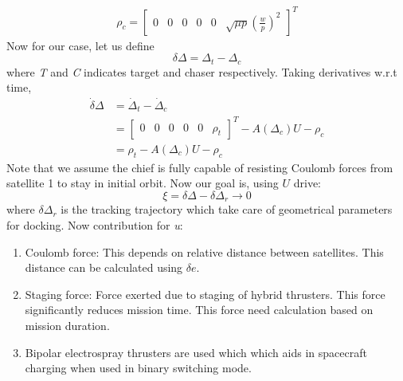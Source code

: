 \documentclass[]{article}
\theoremstyle{remark}
\theoremstyle{definition}
\begin{document}
	\begin{align}
		\rho_c = \begin{bmatrix} 0 & 0 & 0 &0& 0 & \sqrt{\mu p}\left(\frac{w}{p}\right)^2 \end{bmatrix}^T
	\end{align}
	\newline
	Now for our case, let us define 
	\begin{equation}
		\delta \Delta = \Delta_t-\Delta_c
	\end{equation}
	where \textit{T} and \textit{C} indicates target and chaser respectively. Taking derivatives w.r.t time,
	\begin{align}
		\dot \delta \Delta &= \dot \Delta_t - \dot \Delta_c \\
		&= \begin{bmatrix} 0&0&0&0&0&\rho_t
		\end{bmatrix}^T - A(\Delta_c)U-\rho_c\\
		& = \rho_t -  A(\Delta_c)U-\rho_c
	\end{align}
	Note that we assume the chief is fully capable of resisting Coulomb forces from satellite 1 to stay in initial orbit. \newline
	Now our goal is, using $U$ drive:
	\[
	\xi = \delta \Delta-\delta \Delta_r \to 0
	\]
	where $\delta \Delta_r$ is the tracking trajectory which take care of geometrical parameters for docking. \newline 
	Now contribution for \textit{u}:
	\begin{enumerate}
		\item Coulomb force: This depends on relative distance between satellites. This distance can be calculated using $\delta e$. 
		\item Staging force: Force exerted due to staging of hybrid thrusters. This force significantly reduces mission time. This force need calculation based on mission duration.
		\item Bipolar electrospray thrusters are used which which aids in spacecraft charging when used in binary switching mode.
	\end{enumerate}
\end{document}
